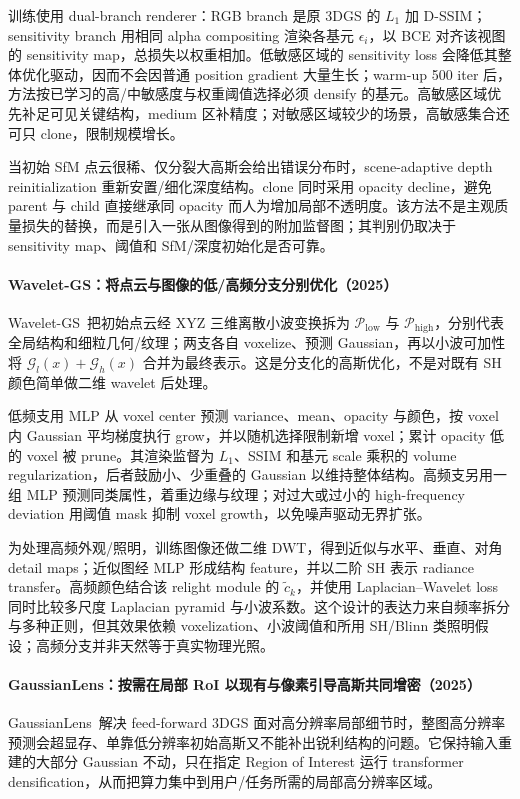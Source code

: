 训练使用 dual-branch renderer：RGB branch 是原 3DGS 的 $L_1$ 加 D-SSIM；sensitivity branch 用相同 alpha compositing 渲染各基元 $\epsilon_i$，以 BCE 对齐该视图的 sensitivity map，总损失以权重相加。低敏感区域的 sensitivity loss 会降低其整体优化驱动，因而不会因普通 position gradient 大量生长；warm-up 500 iter 后，方法按已学习的高/中敏感度与权重阈值选择必须 densify 的基元。高敏感区域优先补足可见关键结构，medium 区补精度；对敏感区域较少的场景，高敏感集合还可只 clone，限制规模增长。

当初始 SfM 点云很稀、仅分裂大高斯会给出错误分布时，scene-adaptive depth reinitialization 重新安置/细化深度结构。clone 同时采用 opacity decline，避免 parent 与 child 直接继承同 opacity 而人为增加局部不透明度。该方法不是主观质量损失的替换，而是引入一张从图像得到的附加监督图；其判别仍取决于 sensitivity map、阈值和 SfM/深度初始化是否可靠。

\paragraph{Wavelet-GS：将点云与图像的低/高频分支分别优化（2025）\cite{2507_12498}}
Wavelet-GS~\cite{2507_12498}把初始点云经 XYZ 三维离散小波变换拆为 $\mathcal P_{\mathrm{low}}$ 与 $\mathcal P_{\mathrm{high}}$，分别代表全局结构和细粒几何/纹理；两支各自 voxelize、预测 Gaussian，再以小波可加性将 $\mathcal G_l(x)+\mathcal G_h(x)$ 合并为最终表示。这是分支化的高斯优化，不是对既有 SH 颜色简单做二维 wavelet 后处理。

低频支用 MLP 从 voxel center 预测 variance、mean、opacity 与颜色，按 voxel 内 Gaussian 平均梯度执行 grow，并以随机选择限制新增 voxel；累计 opacity 低的 voxel 被 prune。其渲染监督为 $L_1$、SSIM 和基元 scale 乘积的 volume regularization，后者鼓励小、少重叠的 Gaussian 以维持整体结构。高频支另用一组 MLP 预测同类属性，着重边缘与纹理；对过大或过小的 high-frequency deviation 用阈值 mask 抑制 voxel growth，以免噪声驱动无界扩张。

为处理高频外观/照明，训练图像还做二维 DWT，得到近似与水平、垂直、对角 detail maps；近似图经 MLP 形成结构 feature，并以二阶 SH 表示 radiance transfer。高频颜色结合该 relight module 的 $\tilde c_k$，并使用 Laplacian--Wavelet loss 同时比较多尺度 Laplacian pyramid 与小波系数。这个设计的表达力来自频率拆分与多种正则，但其效果依赖 voxelization、小波阈值和所用 SH/Blinn 类照明假设；高频分支并非天然等于真实物理光照。

\paragraph{GaussianLens：按需在局部 RoI 以现有与像素引导高斯共同增密（2025）\cite{2509_25603}}
GaussianLens~\cite{2509_25603}解决 feed-forward 3DGS 面对高分辨率局部细节时，整图高分辨率预测会超显存、单靠低分辨率初始高斯又不能补出锐利结构的问题。它保持输入重建的大部分 Gaussian 不动，只在指定 Region of Interest 运行 transformer densification，从而把算力集中到用户/任务所需的局部高分辨率区域。

